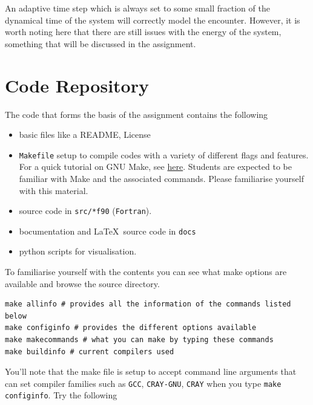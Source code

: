 \par 
An adaptive time step which is always set to some small fraction of the dynamical time of the system will correctly model the encounter. However, it is worth noting here that there are still issues with the energy of the system, something that will be discussed in the assignment. 


\section{Code Repository}\label{sec:code}
The code that forms the basis of the assignment contains the following 
\begin{itemize}
	\item basic files like a README, License
	\item \texttt{Makefile} setup to compile codes with a variety of different flags and features. For a quick tutorial on GNU Make, see \href{https://www.gnu.org/software/make/}{here}. Students are expected to be familiar with Make and the associated commands. Please familiarise yourself with this material. 
	\item source code in \texttt{src/*f90} (\texttt{Fortran}). 
	\item bocumentation and \LaTeX\ source code in \texttt{docs}
	\item python scripts for visualisation. 
\end{itemize}
To familiarise yourself with the contents you can see what make options are available and browse the source directory. 
\begin{center}
\begin{minipage}{0.95\textwidth}
\small
\begin{verbatim}
make allinfo # provides all the information of the commands listed below  
make configinfo # provides the different options available 
make makecommands # what you can make by typing these commands
make buildinfo # current compilers used
\end{verbatim}
\end{minipage}
\end{center}
You'll note that the make file is setup to accept command line arguments that can set compiler families such as \texttt{GCC}, \texttt{CRAY-GNU}, \texttt{CRAY} when you type \texttt{make configinfo}. Try the following
